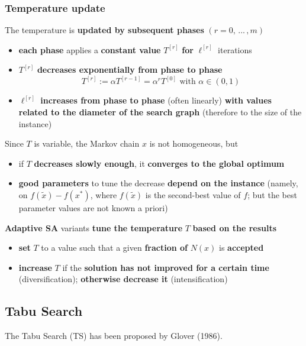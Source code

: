 \newpage

\subsubsection{Temperature update}
The temperature is \textbf{updated by subsequent phases} $(r = 0, \, ... \, , m)$
\begin{itemize}
	\item \textbf{each phase} applies a \textbf{constant value} $T^{[r]}$ \textbf{for} $\ell^{[r ]}$ iterations
	
	\item $T^{[r]}$ \textbf{decreases exponentially from phase to phase}
	$$ T^{[r ]} := \alpha T^{[r −1]} = \alpha^r T^{[0]} \text{ with } \alpha \in (0, 1) $$
	
	\item $\ell^{[r ]}$ \textbf{increases from phase to phase} (often linearly) \textbf{with values related to the diameter of the search graph} (therefore to the size of the instance)
\end{itemize}

Since $T$ is variable, the Markov chain $x$ is not homogeneous, but
\begin{itemize}
	\item if $T$ \textbf{decreases slowly enough}, it \textbf{converges to the global optimum}
	
	\item \textbf{good parameters} to tune the decrease \textbf{depend on the instance} (namely, on $f (\tilde{x}) - f (x^\ast)$, where $f (\tilde{x})$ is the second-best value of $f$; but the best parameter values are not known a priori)
\end{itemize}

\textbf{Adaptive SA} variants \textbf{tune the temperature} $T$ \textbf{based on the results}
\begin{itemize}
	\item \textbf{set} $T$ to a value such that a given \textbf{fraction of} $N (x)$ is \textbf{accepted}
	
	\item \textbf{increase} $T$ if the \textbf{solution has not improved for a certain time} (diversification); \textbf{otherwise decrease it} (intensification)
\end{itemize}

\newpage

\subsection{Tabu Search}
The Tabu Search (TS) has been proposed by Glover (1986).\\

